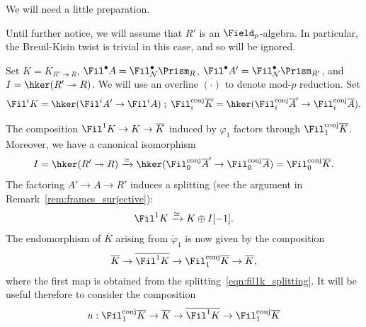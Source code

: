 \documentclass[10pt]{amsart}
\begin{document}
We will need a little preparation. 
\begin{assumption}
Until further notice, we will assume that $R'$ is an $\Field_p$-algebra. In particular, the Breuil-Kisin twist is trivial in this case, and so will be ignored.
\end{assumption}

\begin{notation}
Set $K = K_{R'\twoheadrightarrow R}$, $\Fil^\bullet A = \Fil^\bullet_{\mathcal{N}}\Prism_R$, $\Fil^\bullet A' = \Fil^\bullet_{\mathcal{N}}\Prism_{R'}$, and $I = \hker(R'\twoheadrightarrow R)$. We will use an overline $\overline{(\cdot)}$ to denote mod-$p$ reduction. Set 
\[
\Fil^iK = \hker(\Fil^iA'\to \Fil^iA)\;;\; \Fil^{\mathrm{conj}}_i\overline{K} = \hker(\Fil^{\mathrm{conj}}_i\overline{A}'\to \Fil^{\mathrm{conj}}_i\overline{A}).
\]
\end{notation}



\begin{remark}
\label{rem:reduction_to_map_u}
The composition $\Fil^1K\to K \to \overline{K}$ induced by $\varphi_1$ factors through $\Fil^{\mathrm{conj}}_1\overline{K}$. Moreover, we have a canonical isomorphism
\[
I=\hker(R'\twoheadrightarrow R)\xrightarrow{\simeq}\hker(\Fil^{\mathrm{conj}}_0\overline{A}'\to \Fil^{\mathrm{conj}}_0\overline{A})=\Fil^{\mathrm{conj}}_0\overline{K}.
\]
The factoring $A'\to A\to R'$ induces a splitting (see the argument in Remark~\ref{rem:frames_surjective}):
\begin{align}\label{eqn:fil1k_splitting}
\Fil^1K \xrightarrow{\simeq}K\oplus I[-1].
\end{align}
The endomorphism of $\overline{K}$ arising from $\dot{\varphi}_1$ is now given by the composition
\begin{align*}
\overline{K} \to \overline{\Fil^1K} \to \Fil^{\mathrm{conj}}_1\overline{K} \to \overline{K},
\end{align*}
where the first map is obtained from the splitting~\eqref{eqn:fil1k_splitting}. It will be useful therefore to consider the composition
\begin{align}\label{eqn:factoring_through_u}
u:\Fil^{\mathrm{conj}}_1\overline{K}\to \overline{K}\to \overline{\Fil^1K}\to \Fil^{\mathrm{conj}}_1\overline{K}
\end{align}

\end{remark}
\end{document}
